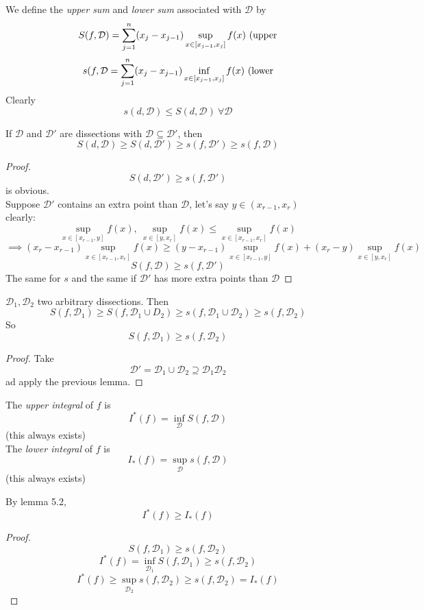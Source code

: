 \begin{definition}
We define the \emph{upper sum} and \emph{lower sum} associated with $\mathcal{D}$ by
\[S(f,\mathcal{D}) = \s[j] n (x_j - x_{j-1})\sup_{x\in [x_{j-1},x_j]}f(x) \text{ (upper}\]
\[s(f,\mathcal{D} = \s[j] n (x_j - x_{j-1})\inf_{x\in [x_{j-1},x_j]}f(x) \text{ (lower}\]
Clearly
\[s(d,\mathcal{D})\leq S(d,\mathcal{D}) \ \forall \mathcal{D}\]
\end{definition}
\begin{lemma}
If $\mathcal{D}$ and $\mathcal{D}'$ are dissections with $\mathcal{D}\subseteq \mathcal{D}'$, then
\[S(d,\mathcal{D})\geq S(d,\mathcal{D'}) \geq s(f,\mathcal{D}')\geq s(f,\mathcal{D})\]
\begin{proof}
\[S(d,\mathcal{D'}) \geq s(f,\mathcal{D}')\]
is obvious.\\
Suppose $\mathcal{D'}$ contains an extra point than $\mathcal{D}$, let's say $y\in (x_{r-1},x_r)$\\
clearly:
\[\sup_{x\in [x_{r-1},y]}f(x), \ \sup_{x\in [y,x_r]}f(x)\leq \sup_{x\in [x_{r-1},x_r]} f(x)\]
\[\implies(x_r - x_{r-1})\sup_{x\in [x_{r-1},x_r]} f(x) \geq (y-x_{r-1})\sup_{x\in [x_{r-1},y]}f(x) + (x_r - y)\sup_{x\in [y,x_r]}f(x)\]
\[S(f,\mathcal{D})\geq s(f,\mathcal{D}')\]
The same for $s$ and the same if $\mathcal{D'}$ has more extra points than $\mathcal{D}$
\end{proof}
\end{lemma}
\begin{lemma}
$\mathcal{D}_1,\mathcal{D}_2$ two arbitrary dissections. Then
\[S(f,\mathcal{D}_1)\geq S(f,\mathcal{D}_1\cup D_2)\geq s(f,\mathcal{D}_1\cup \mathcal{D}_2)\geq s(f,\mathcal{D}_2)\]
So
\[S(f,\mathcal{D}_1)\geq s(f,\mathcal{D}_2)\]
\begin{proof}
Take
\[\mathcal{D}' = \mathcal{D}_1\cup \mathcal{D}_2\supseteq \mathcal{D}_1\mathcal{D}_2\]
ad apply the previous lemma.
\end{proof}
\end{lemma}
\begin{definition}
The \emph{upper integral} of $f$ is
\[I^*(f) = \inf_{\mathcal{D}}S(f,\mathcal{D})\]
(this always exists)\\
The \emph{lower integral} of $f$ is
\[I_*(f) = \sup_{\mathcal{D}}s(f,\mathcal{D})\]
(this always exists)
\end{definition}
\begin{claim}
By lemma 5.2,
\[I^*(f) \geq I_*(f)\]
\begin{proof}
\[S(f,\mathcal{D}_1)\geq s(f,\mathcal{D}_2)\]
\[I^*(f) = \inf_{\mathcal{D}_1}S(f,\mathcal{D_1}) \geq s(f,\mathcal{D}_2)\]
\[I^*(f) \geq \sup_{\mathcal{D}_2}s(f,\mathcal{D_2}) \geq s(f,\mathcal{D}_2) = I_*(f)\]
\end{proof}
\end{claim}
